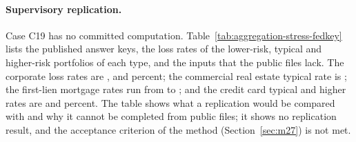 

\paragraph{Supervisory replication.}
Case C19 has no committed computation. Table~\ref{tab:aggregation-stress-fedkey} lists the published answer keys, the loss rates
of the lower-risk, typical and higher-risk portfolios of each type, and the inputs that the public files lack. The corporate
loss rates are {\agstFedCorpLow}, {\agstFedCorpTyp} and {\agstFedCorpHigh} percent; the commercial real estate typical rate is
{\agstFedCreTyp}; the first-lien mortgage rates run from {\agstFedMortLow} to {\agstFedMortHigh}; and the credit card typical and
higher rates are {\agstFedCardTyp} and {\agstFedCardHigh} percent. The table shows what a replication would be
compared with and why it cannot be completed from public files; it shows no replication result, and the acceptance criterion of
the method (Section~\ref{sec:m27}) is not met.


